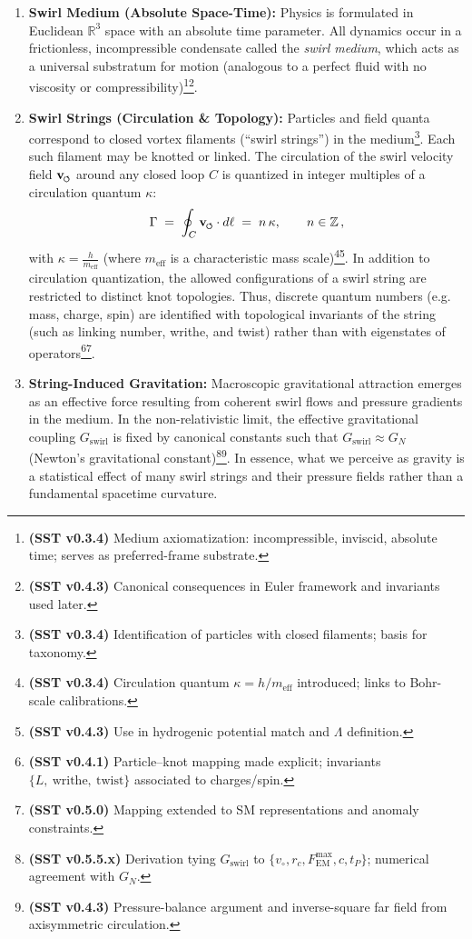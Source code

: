\documentclass[reprint,aps,onecolumn,nofootinbib]{revtex4-2}
\newcommand{\swirlarrow}{%
    \mathchoice{\mkern-2mu\scriptstyle\boldsymbol{\circlearrowleft}}%
    {\mkern-2mu\scriptstyle\boldsymbol{\circlearrowleft}}%
    {\mkern-2mu\scriptscriptstyle\boldsymbol{\circlearrowleft}}%
    {\mkern-2mu\scriptscriptstyle\boldsymbol{\circlearrowleft}}%
}
\newcommand{\vswirl}{\mathbf{v}_{\swirlarrow}}
\newcommand{\rc}{r_c}                                    %
\newcommand{\FmaxEM}{F_{\mathrm{EM}}^{\max}}             %
\begin{document}
    \begin{enumerate}\itemsep 4pt
    \item \textbf{Swirl Medium (Absolute Space-Time):} Physics is formulated in Euclidean $\mathbb{R}^3$ space with an absolute time parameter. All dynamics occur in a frictionless, incompressible condensate called the \emph{swirl medium}, which acts as a universal substratum for motion (analogous to a perfect fluid with no viscosity or compressibility)\footnote{\textbf{(SST v0.3.4)} Medium axiomatization: incompressible, inviscid, absolute time; serves as preferred-frame substrate.}\footnote{\textbf{(SST v0.4.3)} Canonical consequences in Euler framework and invariants used later.}.
    \item \textbf{Swirl Strings (Circulation \& Topology):} Particles and field quanta correspond to closed vortex filaments (“swirl strings”) in the medium\footnote{\textbf{(SST v0.3.4)} Identification of particles with closed filaments; basis for taxonomy.}. Each such filament may be knotted or linked. The circulation of the swirl velocity field $\vswirl$ around any closed loop $C$ is quantized in integer multiples of a circulation quantum $\kappa$:
    \[
        \Gamma \;=\; \oint_{C} \vswirl \cdot d\ell \;=\; n\,\kappa, \qquad n\in \mathbb{Z}\,,
    \]
    with $\displaystyle \kappa = \frac{h}{m_{\mathrm{eff}}}$ (where $m_{\mathrm{eff}}$ is a characteristic mass scale)\footnote{\textbf{(SST v0.3.4)} Circulation quantum $\kappa=h/m_{\mathrm{eff}}$ introduced; links to Bohr-scale calibrations.}\footnote{\textbf{(SST v0.4.3)} Use in hydrogenic potential match and $\Lambda$ definition.}. In addition to circulation quantization, the allowed configurations of a swirl string are restricted to distinct knot topologies. Thus, discrete quantum numbers (e.g. mass, charge, spin) are identified with topological invariants of the string (such as linking number, writhe, and twist) rather than with eigenstates of operators\footnote{\textbf{(SST v0.4.1)} Particle–knot mapping made explicit; invariants $\{L,\ \text{writhe},\ \text{twist}\}$ associated to charges/spin.}\footnote{\textbf{(SST v0.5.0)} Mapping extended to SM representations and anomaly constraints.}.
    \item \textbf{String-Induced Gravitation:} Macroscopic gravitational attraction emerges as an effective force resulting from coherent swirl flows and pressure gradients in the medium. In the non-relativistic limit, the effective gravitational coupling $G_{\text{swirl}}$ is fixed by canonical constants such that $G_{\text{swirl}} \approx G_N$ (Newton’s gravitational constant)\footnote{\textbf{(SST v0.5.5.x)} Derivation tying $G_{\text{swirl}}$ to $\{v_{\circ},\rc,\FmaxEM,c,t_P\}$; numerical agreement with $G_N$.}\footnote{\textbf{(SST v0.4.3)} Pressure-balance argument and inverse-square far field from axisymmetric circulation.}. In essence, what we perceive as gravity is a statistical effect of many swirl strings and their pressure fields rather than a fundamental spacetime curvature.

\end{enumerate}
\end{document}
